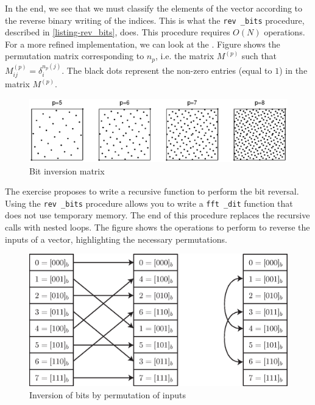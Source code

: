  
In the end, we see that we must classify the elements of the vector according to the reverse binary writing of the indices. This is what the \texttt{rev \_bits} procedure, described in \listingterme{} \ref{listing-rev_bits}, does. This procedure requires $ O(N) $ operations. For a more refined implementation, we can look at the  \cite{nr}. Figure  shows the permutation matrix corresponding to $ n_p $, i.e. the matrix $ M^{(p)} $ such that $ M_{ij}^{(p)} = \delta_{i}^{n_p (j)} $. The black dots represent the non-zero entries (equal to $ 1 $) in the matrix $ M^{(p)} $. \begin{figure}[ht]
    \begin{center}
    \includegraphics [scale = 0.6]{images/rev-bit-matrix.eps}
    \end{center}
    \caption{Bit inversion matrix}
              \label{fig-rev-bit-matrix}
\end{figure}
The exercise  proposes to write a recursive function to perform the bit reversal. Using the \texttt{rev \_bits} procedure allows you to write a \texttt{fft \_dit} function that does not use temporary memory. The end of this procedure replaces the recursive calls with nested \texttt{\pfor} loops. The figure  shows the operations to perform to reverse the inputs of a vector, highlighting the necessary permutations. \begin{figure}[ht]
    \begin{center}
    \includegraphics [scale = 0.6]{images/inversion-bits.eps}
    \end{center}
    \caption{Inversion of bits by permutation of inputs}
              \label{fig-inversion-bits}
\end{figure}
 
